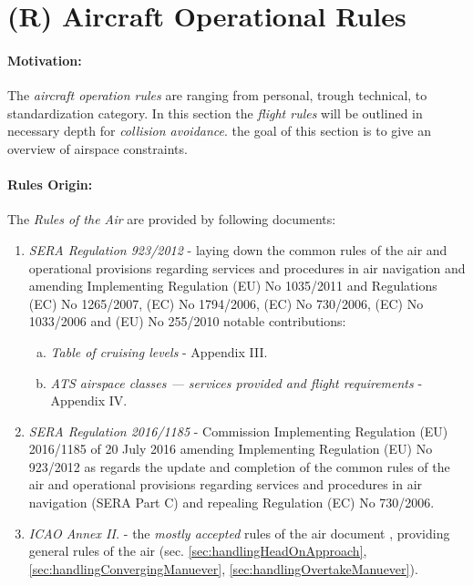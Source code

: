 \section{(R) Aircraft Operational Rules}\label{sec:AircraftOperationRules}
\paragraph{Motivation:} The \emph{aircraft operation rules} are ranging from personal, trough technical, to standardization category. In this section the \emph{flight rules} will be outlined in necessary depth for \emph{collision avoidance}. the goal of this section is to give an overview of airspace constraints. 

\paragraph{Rules Origin:} The \emph{Rules of the Air} are provided by following documents:

\begin{enumerate}
    \item \emph{SERA Regulation 923/2012} - laying down the common rules of the air and operational provisions regarding services and procedures in air navigation and amending Implementing Regulation (EU) No 1035/2011 and Regulations (EC) No 1265/2007, (EC) No 1794/2006, (EC) No 730/2006, (EC) No 1033/2006 and (EU) No 255/2010 \cite{rulesOfTheFlight2012} notable contributions:
    \begin{enumerate}[a.]
        \item \emph{Table of cruising levels} - Appendix III.
        \item \emph{ATS airspace classes — services provided and flight requirements} - Appendix IV.
    \end{enumerate}
    
    \item \emph{SERA Regulation 2016/1185} - Commission Implementing Regulation (EU) 2016/1185 of 20 July 2016 amending Implementing Regulation (EU) No 923/2012 as regards the update and completion of the common rules of the air and operational provisions regarding services and procedures in air navigation (SERA Part C) and repealing Regulation (EC) No 730/2006.

    \item \emph{ICAO  Annex II.} - the \emph{mostly accepted} rules of the air document \cite{icaoAnnex2}, providing general rules of the air (sec. \ref{sec:handlingHeadOnApproach}, \ref{sec:handlingConvergingManuever}, \ref{sec:handlingOvertakeManuever}).
\end{enumerate}

